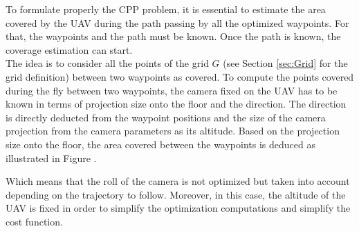 To formulate properly the CPP problem, it is essential to estimate the area covered by the UAV during the path passing by all the optimized waypoints. For that, the waypoints and the path must be known. 
 Once the path is known, the coverage estimation can start. \\
 The idea is to consider all the points of the grid $G$ (see Section \ref{sec:Grid} for the grid definition) between two waypoints as covered. To compute the points covered during the fly between two waypoints, the camera fixed on the UAV has to be known in terms of projection size onto the floor and the direction. %
  The direction is directly deducted from the waypoint positions and the size of the camera projection from the camera parameters as its altitude. %
  Based on the projection size onto the floor, the area covered between the waypoints is deduced as illustrated in Figure .

 
 Which means that the roll of the camera is not optimized but taken into account depending on the trajectory to follow. Moreover, in this case, the altitude of the UAV is fixed in order to simplify the optimization computations and simplify the cost function.

